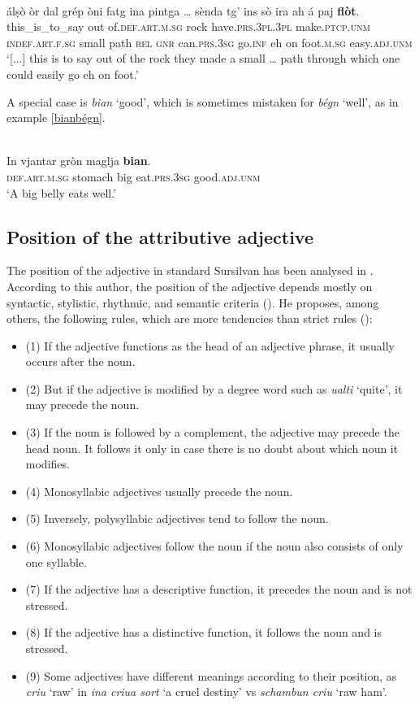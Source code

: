 \ea\label{}
\\
\gll  [...] álṣò òr dal grép òni fatg ina pintga …  sènda tg’ ins sò ira ah á paj \textbf{flòt}.\\
{} this\_is\_to\_say out of.\textsc{def.art.m.sg} rock have.\textsc{prs.3pl.3pl} make.\textsc{ptcp.unm} \textsc{indef.art.f.sg} small {} path \textsc{rel} \textsc{gnr} can.\textsc{prs.3sg} go.\textsc{inf} eh on foot.\textsc{m.sg} easy.\textsc{adj.unm} \\
\glt `[...] this is to say out of the rock they made a small … path through which one could easily go eh on foot.'
\z

A special case is \textit{bian} `good', which is sometimes mistaken for \textit{bégn} `well', as in example {\ref{bianbégn}}.

\ea\label{bianbégn}
\\
\gll  In vjantar gròn maglja \textbf{bian}. \\
     \textsc{def.art.m.sg} stomach big eat.\textsc{prs.3sg} good.\textsc{adj.unm} \\
\glt `A big belly eats well.'
\z

\subsection{Position of the attributive adjective}
The position of the adjective in standard Sursilvan has been analysed in \citet{Winzap1981}. According to this author, the position of the adjective depends mostly on syntactic, stylistic, rhythmic, and semantic criteria (\citet[1]{Winzap1981}). He proposes, among others, the following rules, which are more tendencies than strict rules (\citet[3ff.]{Winzap1981}): 

\begin{itemize}
\item (1) If the adjective functions as the head of an adjective phrase, it usually occurs after the noun.
\item (2) But if the adjective is modified by a degree word such as \textit{ualti} `quite', it may precede the noun.
\item (3) If the noun is followed by a complement, the adjective may precede the head noun. It follows it only in case there is no doubt about which noun it modifies.
\item (4) Monosyllabic adjectives usually precede the noun.
\item (5) Inversely, polysyllabic adjectives tend to follow the noun.
\item (6) Monosyllabic adjectives follow the noun if the noun also consists of only one syllable.
\item (7) If the adjective has a descriptive function, it precedes the noun and is not stressed.
\item (8) If the adjective has a distinctive function, it follows the noun and is stressed.
\item (9) Some adjectives have different meanings according to their position, as \textit{criu} `raw' in \textit{ina criua sort} `a cruel destiny' vs \textit{schambun criu} `raw ham'.
\end{itemize}	

